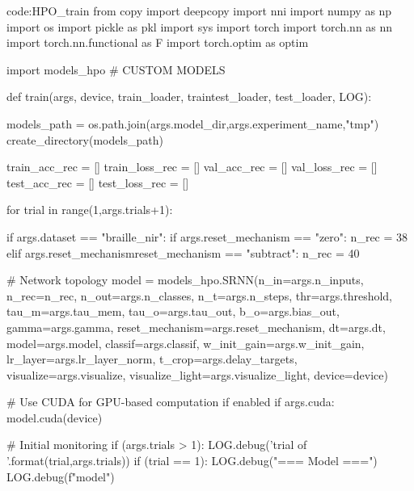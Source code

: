 \begin{mycodebox}{code:HPO_train}
from copy import deepcopy
import nni
import numpy as np
import os
import pickle as pkl
import sys
import torch
import torch.nn as nn
import torch.nn.functional as F
import torch.optim as optim

import models_hpo # CUSTOM MODELS


def train(args, device, train_loader, traintest_loader, test_loader, LOG):

    models_path = os.path.join(args.model_dir,args.experiment_name,"tmp")
    create_directory(models_path)

    train_acc_rec = []
    train_loss_rec = []
    val_acc_rec = []
    val_loss_rec = []
    test_acc_rec = []
    test_loss_rec = []
    
    for trial in range(1,args.trials+1):

        if args.dataset == "braille_nir":
            if args.reset_mechanism == "zero":
                n_rec = 38
            elif args.reset_mechanismreset_mechanism == "subtract":
                n_rec = 40
        
        # Network topology
        model = models_hpo.SRNN(n_in=args.n_inputs,
                            n_rec=n_rec,
                            n_out=args.n_classes,
                            n_t=args.n_steps,
                            thr=args.threshold,
                            tau_m=args.tau_mem,
                            tau_o=args.tau_out,
                            b_o=args.bias_out,
                            gamma=args.gamma,
                            reset_mechanism=args.reset_mechanism,
                            dt=args.dt,
                            model=args.model,
                            classif=args.classif,
                            w_init_gain=args.w_init_gain,
                            lr_layer=args.lr_layer_norm,
                            t_crop=args.delay_targets,
                            visualize=args.visualize,
                            visualize_light=args.visualize_light,
                            device=device)

        # Use CUDA for GPU-based computation if enabled
        if args.cuda:
            model.cuda(device)
        
        # Initial monitoring
        if (args.trials > 1):
            LOG.debug('\nIn trial {} of {}'.format(trial,args.trials))
        if (trial == 1):
            LOG.debug("=== Model ===")
            LOG.debug(f"{model}\n")
        

\end{mycodebox}
